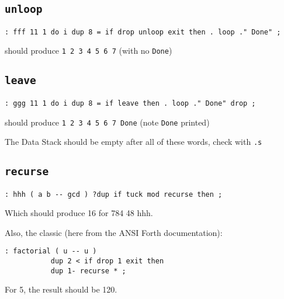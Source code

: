 \subsection{\texttt{unloop}}

\begin{lstlisting}[frame=lines]
        : fff 11 1 do i dup 8 = if drop unloop exit then . loop ." Done" ; 
\end{lstlisting}

\noindent should produce \texttt{1 2 3 4 5 6 7} (with no \texttt{Done})


\subsection{\texttt{leave}}

\begin{lstlisting}[frame=lines]
        : ggg 11 1 do i dup 8 = if leave then . loop ." Done" drop ; 
\end{lstlisting}

\noindent should produce \texttt{1 2 3 4 5 6 7 Done} (note \texttt{Done} printed)

The Data Stack should be empty after all of these words, check with \texttt{.s}


\subsection{\texttt{recurse}}

\begin{lstlisting}[frame=lines]
        : hhh ( a b -- gcd ) ?dup if tuck mod recurse then ;
\end{lstlisting}

\noindent Which should produce 16 for 784 48 hhh. 


Also, the classic (here from the ANSI Forth documentation):

\begin{lstlisting}[frame=lines]
        : factorial ( u -- u ) 
           dup 2 < if drop 1 exit then 
           dup 1- recurse * ;
\end{lstlisting}

\noindent For 5, the result should be 120.



